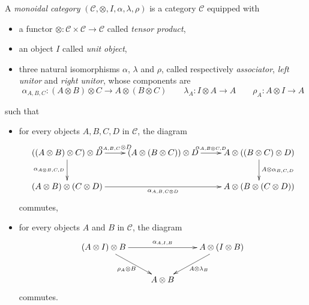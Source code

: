 \begin{definition}
A \emph{monoidal category} $(\mathcal{C},\otimes,I,\alpha,\lambda,\rho)$ is a category $\mathcal{C}$ equipped with
\begin{itemize}
\item a functor $\otimes:\mathcal{C}\times\mathcal{C}\to\mathcal{C}$ called \emph{tensor product},
\item an object $I$ called \emph{unit object},
\item three natural isomorphisms $\alpha$, $\lambda$ and $\rho$, called respectively \emph{associator}, \emph{left unitor} and \emph{right unitor}, whose components are
\begin{equation*}
\alpha_{A,B,C}:(A\otimes B)\otimes C\to A\otimes (B\otimes C)
\qquad
\lambda_A:I\otimes A\to A
\qquad
\rho_A:A\otimes I\to A
\end{equation*}
\end{itemize}
such that
\begin{itemize}
\item for every objects $A,B,C,D$ in $\mathcal{C}$, the diagram
\begin{equation*}
\xymatrix{
    ((A\otimes B)\otimes C)\otimes D\ar[d]_{\alpha_{A\otimes B,C,D}}\ar[r]^{\alpha_{A,B,C}\otimes D}& (A\otimes(B\otimes C))\otimes D\ar[r]^{\alpha_{A,B\otimes C,D}}& A\otimes((B\otimes C)\otimes D)\ar[d]^{A\otimes\alpha_{B,C,D}}\\
    (A\otimes B)\otimes(C\otimes D)\ar[rr]_{\alpha_{A,B,C\otimes D}}& & A\otimes(B\otimes (C\otimes D))
}
\end{equation*}
commutes,
\item for every objects $A$ and $B$ in $\mathcal{C}$, the diagram
\begin{equation*}
\xymatrix{
    (A\otimes I)\otimes B\ar[dr]_{\rho_A\otimes B}\ar[rr]^{\alpha_{A,I,B}}& & \ar[dl]^{A\otimes\lambda_B}A\otimes(I\otimes B)\\
    & A\otimes B& 
}
\end{equation*}
commutes.
\end{itemize}
\end{definition}


